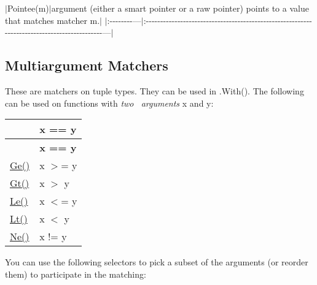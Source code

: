 $\vert${\ttfamily Pointee(m)}$\vert${\ttfamily argument} (either a smart pointer or a raw pointer) points to a value that matches matcher {\ttfamily m}.$\vert$ $\vert$\+:-\/-\/-\/-\/-\/-\/-\/-\/---$\vert$\+:-\/-\/-\/-\/-\/-\/-\/-\/-\/-\/-\/-\/-\/-\/-\/-\/-\/-\/-\/-\/-\/-\/-\/-\/-\/-\/-\/-\/-\/-\/-\/-\/-\/-\/-\/-\/-\/-\/-\/-\/-\/-\/-\/-\/-\/-\/-\/-\/-\/-\/-\/-\/-\/-\/-\/-\/-\/-\/-\/-\/-\/-\/-\/-\/-\/-\/-\/-\/-\/-\/-\/-\/-\/-\/-\/-\/-\/-\/-\/-\/-\/-\/-\/-\/-\/-\/-\/-\/-\/-\/-\/-\/---$\vert$

\subsection*{Multiargument Matchers}

These are matchers on tuple types. They can be used in {\ttfamily .With()}. The following can be used on functions with {\itshape two~\newline
 arguments} {\ttfamily x} and {\ttfamily y}\+:

\tabulinesep=1mm
\begin{longtabu} spread 0pt [c]{*2{|X[-1]}|}
\hline
{}&{\bf {\ttfamily x == y}  }\\
\endfirsthead
\hline
\endfoot
\hline
{}&{\bf {\ttfamily x == y}  }\\
\endhead
{\ttfamily \hyperlink{namespacetesting_a42bb19b42d7830b972973a103d5e00f2}{Ge()}}&{\ttfamily x $>$= y} \\
{\ttfamily \hyperlink{namespacetesting_a493fc1bafd7b3945ba06ace80e74b0d5}{Gt()}}&{\ttfamily x $>$ y} \\
{\ttfamily \hyperlink{namespacetesting_a2e33596921b80a7fdaff3f62bf18a478}{Le()}}&{\ttfamily x $<$= y} \\
{\ttfamily \hyperlink{namespacetesting_ad621459957a8bcdd3c256b7940ecbf99}{Lt()}}&{\ttfamily x $<$ y} \\
{\ttfamily \hyperlink{namespacetesting_afe42d41d5171234cb9da5da27faeb7e8}{Ne()}}&{\ttfamily x != y} \\
\end{longtabu}
You can use the following selectors to pick a subset of the arguments (or reorder them) to participate in the matching\+:


